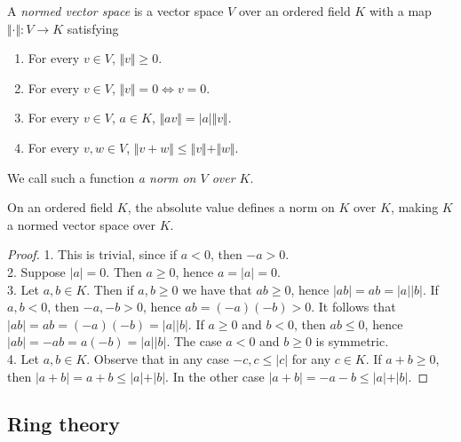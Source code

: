         \begin{definition}
            A \textit{normed vector space} is a vector space $V$ over an ordered field $K$ with a map $\Vert \cdot \Vert : V\rightarrow K$ satisfying 
            \begin{enumerate}
                \item For every $v\in V$, $\Vert v\Vert \geq 0$.
                \item For every $v\in V$, $\Vert v \Vert = 0\iff v = 0$.
                \item For every $v\in V$, $a\in K$, $\Vert av\Vert = \vert a\vert \Vert v\Vert$.
                \item For every $v,w\in V$, $\Vert v+ w\Vert \leq \Vert v\Vert +\Vert w\Vert.$
            \end{enumerate}
            We call such a function \textit{a norm on $V$ over $K$}.
        \end{definition}
        \begin{lemma}
            On an ordered field $K$, the absolute value defines a norm on $K$ over $K$, making $K$ a normed vector space over $K$.
        \end{lemma}
        \begin{proof}
            1. This is trivial, since if $a <0$, then $-a>0$.\\
            2. Suppose $\vert a \vert =0$. Then $a\geq 0$, hence $a=\vert a\vert =0$.\\
            3. Let $a,b\in K$. Then if $a,b\geq 0$ we have that $ab\geq 0$, hence $\vert ab\vert = ab=\vert a \vert \vert b\vert$. If $a,b <0$, then $-a,-b>0$, hence $ab=(-a)(-b)>0$. It follows that $\vert ab\vert=ab =(-a)(-b)=\vert a\vert \vert b\vert$. If $a\geq 0$ and $b<0$, then $ab\leq 0$, hence $\vert ab\vert = -ab=a(-b)=\vert a\vert \vert b\vert$. The case $a<0$ and $b\geq 0$ is symmetric.\\
            4. Let $a,b\in K$. Observe that in any case $-c,c\leq \vert c \vert $ for any $c\in K$. If $a+b\geq 0$, then $\vert a+b\vert = a+b\leq \vert a \vert +\vert b\vert$. In the other case $\vert a+b\vert = -a-b\leq \vert a \vert + \vert b\vert $.
        \end{proof}
\subsection{Ring theory}
